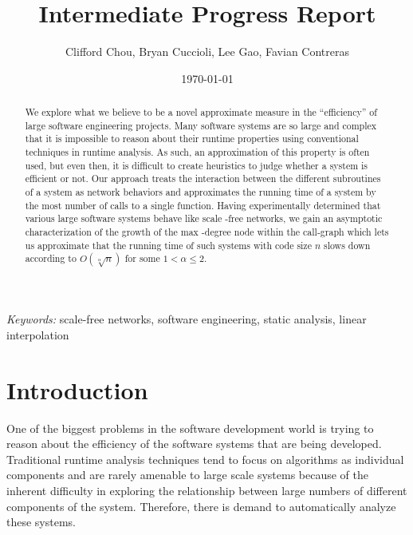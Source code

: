 \documentclass[11pt,a4paper]{article}
\author{Clifford Chou, Bryan Cuccioli, Lee Gao, 
Favian Contreras}
\date{\today}
\title{\textbf{Intermediate Progress Report}} %
\begin{document}


\renewcommand{\abstractname}{Abstract} %
\begin{singlespace}
\maketitle
\begin{abstract}
We explore what we believe to be a novel approximate measure in the 
``efficiency'' of large software engineering projects. Many software systems 
are so large and complex that it is impossible to reason about their
runtime properties using conventional techniques in runtime 
analysis. As such, an approximation of this property is often used, but even 
then, it is difficult to create heuristics to judge whether a system is 
efficient or not. Our approach treats the interaction between the different 
subroutines of a system as network behaviors and approximates the running time 
of a system by the most number of calls to a single function. Having 
experimentally determined that various large software systems behave like scale
-free networks, we gain an asymptotic characterization of the growth of the max
-degree node within the call-graph which lets us approximate that the running 
time of such systems with code size $n$ slows down according to 
$O(\sqrt[\alpha]{n})$ for some $1 < \alpha \le 2$.
\end{abstract}

\hspace*{3,6mm}\textit{Keywords:} {\sf \small  scale-free networks, software 
engineering, static analysis, linear interpolation} %
\end{singlespace}
\vspace{30pt} %


\section*{Introduction}
One of the biggest problems in the software development world is trying to 
reason about the efficiency of the software systems that are being developed. 
Traditional runtime analysis techniques tend to focus on algorithms as 
individual components and are rarely amenable to large scale systems because 
of the inherent difficulty in exploring the relationship between large numbers of 
different components of the system. Therefore, there is demand to 
automatically analyze these systems.
\end{document}
